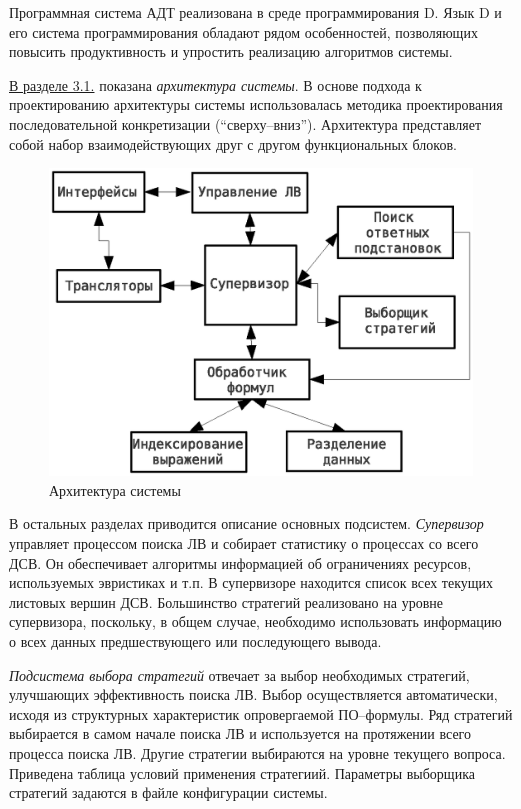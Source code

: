 \documentclass[a4paper]{report}
\begin{document}
Программная система АДТ реализована в среде программирования D. Язык D и его система программирования обладают рядом особенностей, позволяющих повысить продуктивность и упростить реализацию алгоритмов системы.

\underline{В разделе 3.1.} показана \emph{архитектура системы}. В основе подхода к проектированию архитектуры системы использовалась методика проектирования последовательной конкретизации (``сверху--вниз''). Архитектура представляет собой набор взаимодействующих друг с другом функциональных блоков.
\begin{figure}[htb]
    \centering
    \includegraphics[width=0.5\linewidth]{pics/Design1.eps}
    \caption{Архитектура системы}
    \label{fig:design1}
\end{figure}

В остальных разделах приводится описание основных подсистем.
\emph{Супервизор} управляет процессом поиска ЛВ и собирает статистику о процессах со всего ДСВ. Он обеспечивает алгоритмы информацией об ограничениях ресурсов, используемых эвристиках и т.п. В супервизоре находится список всех текущих листовых вершин ДСВ. Большинство стратегий реализовано на уровне супервизора, поскольку, в общем случае, необходимо использовать информацию о всех данных предшествующего или последующего вывода.

\emph{Подсистема выбора стратегий} отвечает за выбор необходимых стратегий, улучшающих эффективность поиска ЛВ. Выбор осуществляется автоматически, исходя из структурных характеристик опровергаемой ПО--формулы. Ряд стратегий выбирается в самом начале поиска ЛВ и используется на протяжении всего процесса поиска ЛВ. Другие стратегии выбираются на уровне текущего вопроса. Приведена таблица условий применения стратегиий. Параметры выборщика стратегий задаются в файле конфигурации системы.
\end{document}

